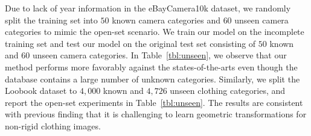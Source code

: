 \documentclass[runningheads]{llncs}
\begin{document}
Due to lack of year information in the eBayCamera10k dataset, we randomly split the training set into $50$ known camera categories and $60$ unseen camera categories to mimic the open-set scenario.
We train our model on the incomplete training set and test our model on the original test set consisting of $50$ known and $60$ unseen camera categories. 
In Table~\ref{tbl:unseen}, we observe that our method performs more favorably against the states-of-the-arts even though the database contains a large number of unknown categories. Similarly, we split the Loobook dataset to $4,000$ known and $4,726$ unseen clothing categories, and report the open-set experiments in Table~\ref{tbl:unseen}. The results are consistent with previous finding that it is challenging to learn geometric transformations for non-rigid clothing images. %
\end{document}
